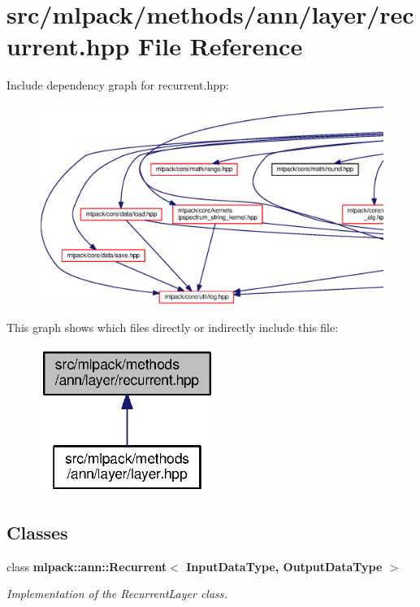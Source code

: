 \section{src/mlpack/methods/ann/layer/recurrent.hpp File Reference}
\label{recurrent_8hpp}
Include dependency graph for recurrent.\+hpp\+:
\nopagebreak
\begin{figure}[H]
\begin{center}
\leavevmode
\includegraphics[width=350pt]{recurrent_8hpp__incl}
\end{center}
\end{figure}
This graph shows which files directly or indirectly include this file\+:
\nopagebreak
\begin{figure}[H]
\begin{center}
\leavevmode
\includegraphics[width=163pt]{recurrent_8hpp__dep__incl}
\end{center}
\end{figure}
\subsection*{Classes}
\begin{DoxyCompactItemize}
\item 
class {\bf mlpack\+::ann\+::\+Recurrent$<$ Input\+Data\+Type, Output\+Data\+Type $>$}
\begin{DoxyCompactList}\small\item\em Implementation of the Recurrent\+Layer class. \end{DoxyCompactList}\end{DoxyCompactItemize}
